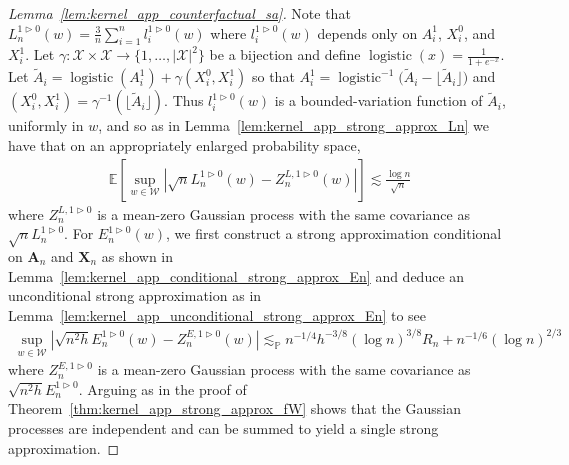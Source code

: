 \documentclass[11pt,lof]{puthesis}
\renewcommand{\P}{\ensuremath{\mathbb{P}}}
\newcommand{\E}{\ensuremath{\mathbb{E}}}
\newcommand{\bX}{\ensuremath{\mathbf{X}}}
\newcommand{\bA}{\ensuremath{\mathbf{A}}}
\newcommand{\cX}{\ensuremath{\mathcal{X}}}
\newcommand{\cW}{\ensuremath{\mathcal{W}}}
\DeclareMathOperator*{\logistic}{logistic}
\theoremstyle{break}
\theoremstyle{proof}
\newtheorem{proof}{Proof}
\begin{document}
\begin{proof}[Lemma~\ref{lem:kernel_app_counterfactual_sa}]

  Note that
  $L_n^{1 \triangleright 0}(w)
  = \frac 3n \sum_{i=1}^n l_i^{1 \triangleright 0}(w)$
  where $l_i^{1 \triangleright 0}(w)$ depends only on
  $A_i^1$, $X_i^0$, and $X_i^1$.
  Let $\gamma: \cX \times \cX \to \{1, \ldots, |\cX|^2\}$
  be a bijection and
  define $\logistic(x) = \frac{1}{1+e^{-x}}$.
  Let
  $\tilde A_i = \logistic(A_i^1) + \gamma(X_i^0, X_i^1)$
  so that
  $A_i^1 = \logistic^{-1}\big(\tilde A_i
  - \lfloor \tilde A_i \rfloor\big)$
  and
  $(X_i^0, X_i^1) = \gamma^{-1}(\lfloor \tilde A_i \rfloor)$.
  Thus
  $l_i^{1 \triangleright 0}(w)$ is a bounded-variation function
  of $\tilde A_i$, uniformly in $w$, and so as in
  Lemma~\ref{lem:kernel_app_strong_approx_Ln} we have that
  on an appropriately enlarged probability space,
  \begin{align*}
    \E\left[
      \sup_{w \in \cW}
      \left|
      \sqrt n L_n^{1 \triangleright 0}(w)
      - Z_n^{L, 1 \triangleright 0}(w)
      \right|
    \right]
    \lesssim
    \frac{\log n}{\sqrt n}
  \end{align*}
  where $Z_n^{L, 1 \triangleright 0}$ is a mean-zero
  Gaussian process with the same covariance as
  $\sqrt n L_n^{1 \triangleright 0}$.
  For $E_n^{1 \triangleright 0}(w)$,
  we first construct a strong approximation conditional on
  $\bA_n$ and $\bX_n$ as shown in
  Lemma~\ref{lem:kernel_app_conditional_strong_approx_En}
  and deduce an unconditional strong approximation as in
  Lemma~\ref{lem:kernel_app_unconditional_strong_approx_En} to see
  \begin{align*}
    \sup_{w \in \cW}
    \left|
    \sqrt{n^2h} E_n^{1 \triangleright 0}(w)
    - Z_n^{E, 1 \triangleright 0}(w)
    \right|
    \lesssim_\P
    n^{-1/4} h^{-3/8} (\log n)^{3/8} R_n
    + n^{-1/6} (\log n)^{2/3}
  \end{align*}
  where $Z_n^{E, 1 \triangleright 0}$ is a mean-zero
  Gaussian process with the same covariance as
  $\sqrt{n^2h} E_n^{1 \triangleright 0}$.
  Arguing as in the proof of Theorem~\ref{thm:kernel_app_strong_approx_fW}
  shows that the Gaussian processes are independent
  and can be summed to yield a single strong approximation.
\end{proof}
\end{document}
